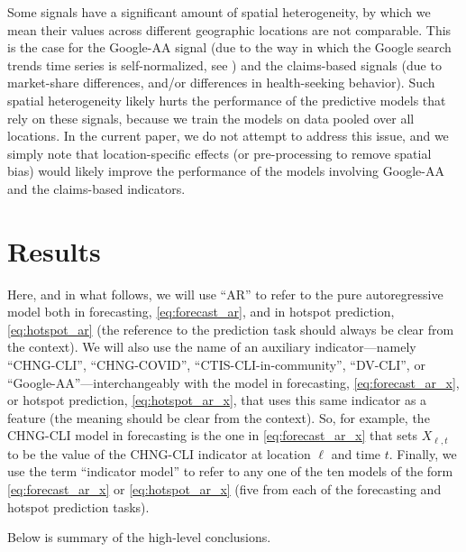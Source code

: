 \documentclass[9pt,twocolumn,twoside,lineno]{pnas-new}
\begin{document}
Some signals have a significant amount of spatial heterogeneity, by which we
mean their values across different geographic locations are not comparable.
This is the case for the Google-AA signal (due to the way in which the
Google search trends time series is self-normalized, see
\cite{GoogleSymptoms}) and the claims-based signals (due to market-share 
differences, and/or differences in health-seeking behavior).  Such spatial
heterogeneity likely hurts the performance of the predictive models that rely on
these signals, because we train the models on data pooled over all locations.
In the current paper, we do not attempt to address this issue, and we simply
note that location-specific effects (or pre-processing to remove spatial bias)
would likely improve the performance of the models involving Google-AA and the
claims-based indicators. 

\section{Results}

Here, and in what follows, we will use ``AR'' to refer to the pure 
autoregressive model both in forecasting, \eqref{eq:forecast_ar}, and in hotspot
prediction, \eqref{eq:hotspot_ar} (the reference to the prediction task should
always be clear from the context). We will also use the name of an auxiliary 
indicator---namely ``CHNG-CLI'',  ``CHNG-COVID'', ``CTIS-CLI-in-community'',
``DV-CLI'', or ``Google-AA''---interchangeably with the model in forecasting, 
\eqref{eq:forecast_ar_x}, or hotspot prediction, \eqref{eq:hotspot_ar_x}, that
uses this same indicator as a feature (the meaning should be clear from
the context).  So, for example, the CHNG-CLI model in forecasting is the one in  
\eqref{eq:forecast_ar_x} that sets $X_{\ell,t}$ to be the value of the CHNG-CLI
indicator at location $\ell$ and time $t$.  Finally, we use the term ``indicator
model'' to refer to any one of the ten models of the form
\eqref{eq:forecast_ar_x} or \eqref{eq:hotspot_ar_x} (five from each of the
forecasting and hotspot prediction tasks).

Below is summary of the high-level conclusions.  
\end{document}
